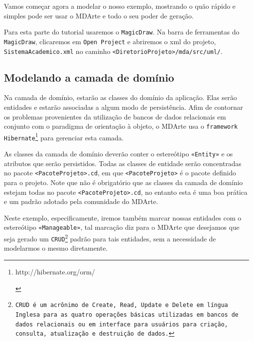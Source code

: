 Vamos começar agora a modelar o nosso exemplo, mostrando o quão rápido e simples
pode ser usar o MDArte e todo o seu poder de geração.

Para esta parte do tutorial usaremos o \texttt{MagicDraw}. Na barra de
ferramentas do \texttt{MagicDraw}, clicaremos em \texttt{Open Project} e
abriremos o xml do projeto, \texttt{SistemaAcademico.xml} no caminho
\texttt{<DiretorioProjeto>/mda/src/uml/}.

\subsection{Modelando a camada de domínio}
Na camada de domínio, estarão as classes do domínio da aplicação. Elas serão
entidades e estarão associadas a algum modo de persistência. Afim de
contornar os problemas provenientes da utilização de bancos de dados relacionais
em conjunto com o paradigma de orientação à objeto, o MDArte usa o
\texttt{framework}
\texttt{Hibernate}\footnote{\hypertarget{http://hibernate.org/orm/}{http://hibernate.org/orm/}}
para gerenciar esta camada.

As classes da camada de domínio deverão conter o estereótipo \texttt{«Entity»} e
os atributos que serão persistidos. Todas as classes de entidade serão
concentradas no pacote \texttt{<PacoteProjeto>.cd}, em que
\texttt{<PacoteProjeto>} é o pacote definido para o projeto. Note que não é
obrigatório que as classes da camada de domínio estejam todas no pacote
\texttt{<PacoteProjeto>.cd}, no entanto esta é uma boa prática e um padrão
adotado pela comunidade do MDArte.

Neste exemplo, especificamente, iremos também marcar nossas entidades com o
estereótipo \texttt{«Manageable»}, tal marcação diz para o MDArte que desejamos
que seja gerado um \texttt{CRUD\footnote{CRUD é um acrônimo de Create, Read,
Update e Delete em língua Inglesa para as quatro operações básicas utilizadas em
bancos de dados relacionais ou em interface para usuários para criação,
consulta, atualização e destruição de dados.}} padrão para tais entidades, sem a
necessidade de modelarmos o mesmo diretamente.

